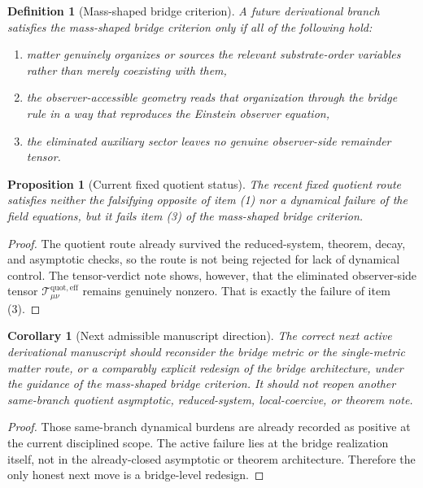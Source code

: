 \documentclass[11pt]{article}
\newcommand{\EffAux}{\mathcal T_{\mu\nu}^{\mathrm{quot,eff}}}
\newtheorem{definition}{Definition}
\newtheorem{proposition}{Proposition}
\newtheorem{corollary}{Corollary}
\begin{document}
\begin{definition}[Mass-shaped bridge criterion]
A future derivational branch satisfies the \emph{mass-shaped bridge criterion} only if all of the following hold:
\begin{enumerate}
    \item matter genuinely organizes or sources the relevant substrate-order variables rather than merely coexisting with them,
    \item the observer-accessible geometry reads that organization through the bridge rule in a way that reproduces the Einstein observer equation,
    \item the eliminated auxiliary sector leaves no genuine observer-side remainder tensor.
\end{enumerate}
\end{definition}

\begin{proposition}[Current fixed quotient status]
The recent fixed quotient route satisfies neither the falsifying opposite of item (1) nor a dynamical failure of the field equations, but it fails item (3) of the mass-shaped bridge criterion.
\end{proposition}

\begin{proof}
The quotient route already survived the reduced-system, theorem, decay, and asymptotic checks, so the route is not being rejected for lack of dynamical control. The tensor-verdict note shows, however, that the eliminated observer-side tensor \(\EffAux\) remains genuinely nonzero. That is exactly the failure of item (3).
\end{proof}

\begin{corollary}[Next admissible manuscript direction]
The correct next active derivational manuscript should reconsider the bridge metric or the single-metric matter route, or a comparably explicit redesign of the bridge architecture, under the guidance of the mass-shaped bridge criterion. It should not reopen another same-branch quotient asymptotic, reduced-system, local-coercive, or theorem note.
\end{corollary}

\begin{proof}
Those same-branch dynamical burdens are already recorded as positive at the current disciplined scope. The active failure lies at the bridge realization itself, not in the already-closed asymptotic or theorem architecture. Therefore the only honest next move is a bridge-level redesign.
\end{proof}
\end{document}
